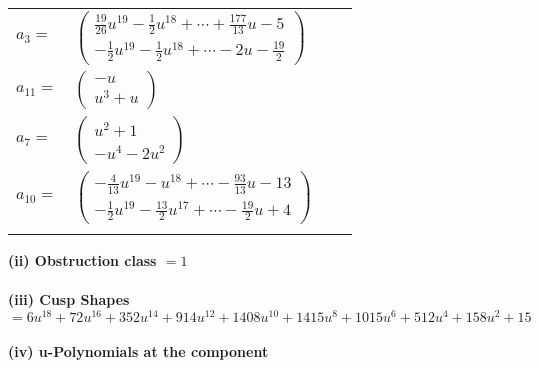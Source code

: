 \documentclass[1p]{elsarticle_modified}
\theoremstyle{definition}
\begin{document}
\begin{tabular}{m{7pt} m{180pt} m{7pt} m{180pt} }
\flushright $a_{3}=$&$\begin{pmatrix}\frac{19}{26} u^{19}-\frac{1}{2} u^{18}+\cdots+\frac{177}{13} u-5\\-\frac{1}{2} u^{19}-\frac{1}{2} u^{18}+\cdots-2 u-\frac{19}{2}\end{pmatrix}$ \\
\flushright $a_{11}=$&$\begin{pmatrix}- u\\u^3+u\end{pmatrix}$ \\
\flushright $a_{7}=$&$\begin{pmatrix}u^2+1\\- u^4-2 u^2\end{pmatrix}$ \\
\flushright $a_{10}=$&$\begin{pmatrix}-\frac{4}{13} u^{19}- u^{18}+\cdots-\frac{93}{13} u-13\\-\frac{1}{2} u^{19}-\frac{13}{2} u^{17}+\cdots-\frac{19}{2} u+4\end{pmatrix}$\\&\end{tabular}
\flushleft \textbf{(ii) Obstruction class $= 1$}\\~\\
\flushleft \textbf{(iii) Cusp Shapes $= 6 u^{18}+72 u^{16}+352 u^{14}+914 u^{12}+1408 u^{10}+1415 u^8+1015 u^6+512 u^4+158 u^2+15$}\\~\\
\newpage\renewcommand{\arraystretch}{1}
\flushleft \textbf{(iv) u-Polynomials at the component}\newline \\
\end{document}
